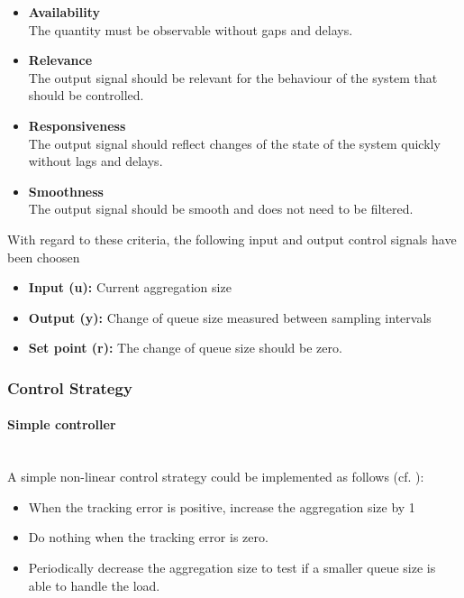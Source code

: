 \begin{itemize}
	\item \textbf{Availability}\\
	The quantity must be observable without gaps and delays.
	\item \textbf{Relevance}\\
	The output signal should be relevant for the behaviour of the system that should be controlled. 
	\item \textbf{Responsiveness}\\
	The output signal should reflect changes of the state of the system quickly without lags and delays.
	\item \textbf{Smoothness}\\
	The output signal should be smooth and does not need to be filtered.
\end{itemize}

With regard to these criteria, the following input and output control signals have been choosen 
\begin{itemize}
	\item \textbf{Input (u):} Current aggregation size
	\item \textbf{Output (y):} Change of queue size measured between sampling intervals
	\item \textbf{Set point (r):} The change of queue size should be zero.
\end{itemize}

\subsubsection{Control Strategy}
\label{sec:ch05_control_strategy}

\paragraph{Simple controller}\mbox{}\\
A simple non-linear control strategy could be implemented as follows (cf. \cite{Janert:2013aa}):
\begin{itemize}
	\item When the tracking error is positive, increase the aggregation size by 1
	\item Do nothing when the tracking error is zero.
	\item Periodically decrease the aggregation size to test if a smaller queue size is able to handle the load.
\end{itemize}

